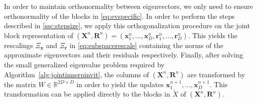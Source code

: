 \documentclass[a4paper,11pt,oneside]{amsart}
\theoremstyle{definition}
\theoremstyle{remark}
\newcommand{\R}{\mathbb{R}}
\newcommand{\ten}[1]{\boldsymbol{#1}}
\numberwithin{equation}{section}
\numberwithin{theorem}{section}
\begin{document}
In order to maintain orthonormality between eigenvectors, we only need to ensure orthonormality of the blocks in \eqref{eq:evspecific}. 
In order to perform the steps described in \cref{ssc:stepsize}, we apply this orthogonalization procedure on the joint block representation of $(\ten X^n, \ten R^n) = (\ten x_1^n, \ldots, \ten x_D^n, \ten r_1^n,\ldots, \ten r_D^n)$. This yields the rescalings $\Xi_{\ten x}$ and $\Xi_{\ten r}$ in \cref{eq:subspacerescale} containing the norms of the approximate eigenvectors and their residuals respectively. Finally, after solving the small generalized eigenvalue problem required by Algorithm~\ref{alg:jointinnerpinvit}, the columns of $(\ten X^n, \ten R^n)$ are transformed by the matrix $W \in \R^{2D \times D}$ in order to yield the updates
$\ten x_1^{n+1},\ldots,\ten x_D^{n+1}$. This transformation can be applied directly to the blocks in $\check X$ of $(\ten X^n, \ten R^n)$. 
%
%
%
%
%
\end{document}
